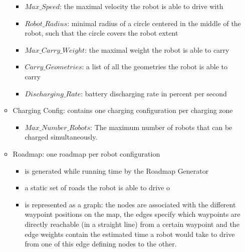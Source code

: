 \documentclass{article}
\begin{document}
\begin{enumerate}
\begin{itemize}
	\begin{itemize}	  
		\item $Max\_Speed$: the maximal velocity the robot is able to drive with
		\item $Robot\_Radius$: minimal radius of a circle centered in the middle of the robot, such that the circle covers the robot extent
		\item $Max\_Carry\_Weight$: the maximal weight the robot is able to carry
		\item $Carry\_Geometries$: a list of all the geometries the robot is able to carry
		\item $Discharging\_Rate$: battery discharging rate in percent per second
	\end{itemize}
	\item Charging Config: contains one charging configuration per charging zone
	\begin{itemize}
	   \item $Max\_Number\_Robots$: The maximum number of robots that can be charged simultaneously.
	\end{itemize}
	\item Roadmap: one roadmap per robot configuration
	\begin{itemize}
	   \item is generated while running time by the Roadmap Generator
	   \item a static set of roads the robot is able to drive o
	   \item is represented as a graph: the nodes are associated with the different waypoint positions on the map, the edges specify which waypoints are directly reachable (in a straight line) from a certain waypoint and the edge weights contain the estimated time a robot would take to drive from one of this edge defining nodes to the other.
	\end{itemize}
 	\end{itemize}
 	

\end{enumerate}
\end{document}
